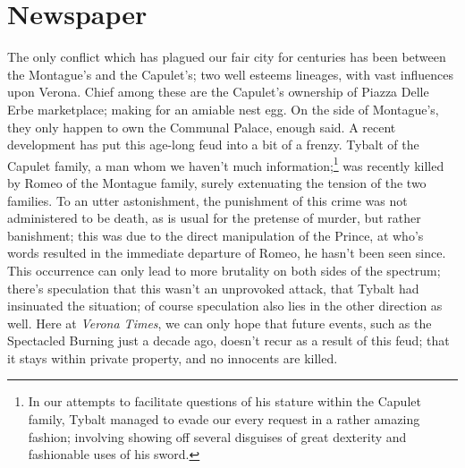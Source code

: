 \documentclass{article}
\begin{document}
\section{Newspaper}
\vspace{0.5in}
{
\date{February 19, 1598}
\maketitle

\setlength{\columnsep}{15pt}
\begin{multicols}{3}
    The only conflict which has plagued our fair city for centuries has been between the Montague's and the Capulet's; two well esteems lineages, with vast influences upon Verona. 
    Chief among these are the Capulet's ownership of Piazza Delle Erbe marketplace; making for an amiable nest egg. 
    On the side of Montague's, they only happen to own the Communal Palace, enough said.
    A recent development has put this age-long feud into a bit of a frenzy.
    Tybalt of the Capulet family, a man whom we haven't much information;\footnote{
        In our attempts to facilitate questions of his stature within the Capulet family, Tybalt managed to evade our every request in a rather amazing fashion; involving showing off several disguises of great dexterity and fashionable uses of his sword.}
        was recently killed by Romeo of the Montague family, surely extenuating the tension of the two families.
    To an utter astonishment, the punishment of this crime was not administered to be death, as is usual for the pretense of murder, but rather banishment;
        this was due to the direct manipulation of the Prince, at who's words resulted in the immediate departure of Romeo, he hasn't been seen since.
    This occurrence can only lead to more brutality on both sides of the spectrum; there's speculation that this wasn't an unprovoked attack, that Tybalt had insinuated the situation; of course speculation also lies in the other direction as well.
    Here at \textit{Verona Times}, we can only hope that future events, such as the Spectacled Burning just a decade ago, doesn't recur as a result of this feud; that it stays within private property, and no innocents are killed.
    \closearticle


\end{multicols}}
\end{document}
